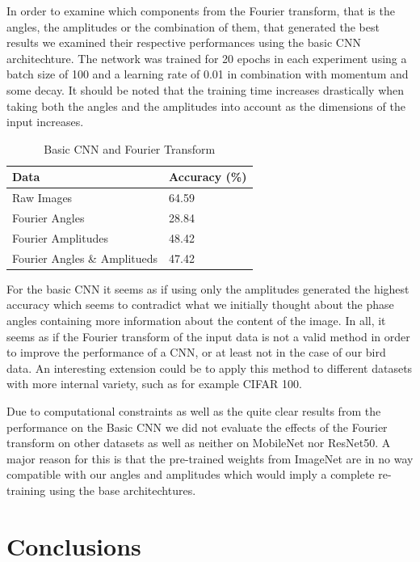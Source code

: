 \documentclass{article}
\begin{document}
In order to examine which components from the Fourier transform, that is the angles, the amplitudes or the combination of them, that generated the best results we examined their respective performances using the basic CNN architechture. The network was trained for 20 epochs in each experiment using a batch size of 100 and a learning rate of 0.01 in combination with momentum and some decay. It should be noted that the training time increases drastically when taking both the angles and the amplitudes into account as the dimensions of the input increases.

\begin{table}[H]
  \caption{Basic CNN and Fourier Transform}
  \label{sample-table}
  \centering
  \begin{tabular}{ll}
    \toprule
    Data & Accuracy (\%) \\
    \midrule
    Raw Images  & 64.59 \\
    Fourier Angles & 28.84   \\
    Fourier Amplitudes & 48.42 \\
    Fourier Angles \& Amplitueds & 47.42 \\
    \bottomrule
  \end{tabular}
\end{table}

For the basic CNN it seems as if using only the amplitudes generated the highest accuracy which seems to contradict what we initially thought about the phase angles containing more information about the content of the image. In all, it seems as if the Fourier transform of the input data is not a valid method in order to improve the performance of a CNN, or at least not in the case of our bird data. An interesting extension could be to apply this method to different datasets with more internal variety, such as for example CIFAR 100.

\medskip

Due to computational constraints as well as the quite clear results from the performance on the Basic CNN we did not evaluate the effects of the Fourier transform on other datasets as well as neither on MobileNet nor ResNet50. A major reason for this is that the pre-trained weights from ImageNet are in no way compatible with our angles and amplitudes which would imply a complete re-training using the base architechtures.

\section{Conclusions}
\end{document}
